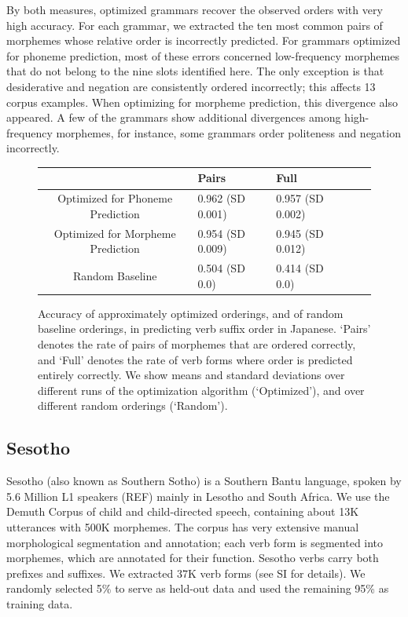 By both measures, optimized grammars recover the observed orders with very high accuracy.
For each grammar, we extracted the ten most common pairs of morphemes whose relative order is incorrectly predicted.
For grammars optimized for phoneme prediction, most of these errors concerned low-frequency morphemes that do not belong to the nine slots identified here.
The only exception is that desiderative and negation are consistently ordered incorrectly; this affects 13 corpus examples.
When optimizing for morpheme prediction, this divergence also appeared.
A few of the grammars show additional divergences among high-frequency morphemes, for instance, some grammars order politeness and negation incorrectly. 





\begin{figure}
\begin{center}
\begin{tabular}{c||llll}
             &       Pairs & Full \\ \hline\hline
Optimized for Phoneme Prediction   &   0.962 (SD 0.001) & 0.957 (SD 0.002) \\
Optimized for Morpheme Prediction  &   0.954 (SD 0.009) & 0.945 (SD 0.012) \\ 
Random Baseline    &  0.504 (SD 0.0) & 0.414 (SD 0.0) \\ 
\end{tabular}
\end{center}
\caption{Accuracy of approximately optimized orderings, and of random baseline orderings, in predicting verb suffix order in Japanese. `Pairs' denotes the rate of pairs of morphemes that are ordered correctly, and `Full' denotes the rate of verb forms where order is predicted entirely correctly. We show means and standard deviations over different runs of the optimization algorithm (`Optimized'), and over different random orderings (`Random').}\label{fig:acc-japanese}
\end{figure}





\subsection{Sesotho}

Sesotho (also known as Southern Sotho) is a Southern Bantu language, spoken by 5.6 Million L1 speakers (REF) mainly in Lesotho and South Africa.
We use the Demuth Corpus \citep{demuth1992acquisition} of child and child-directed speech, containing about 13K utterances with 500K morphemes.
The corpus has very extensive manual morphological segmentation and annotation; each verb form is segmented into morphemes, which are annotated for their function.
Sesotho verbs carry both prefixes and suffixes.
We extracted 37K verb forms (see SI for details).
We randomly selected 5\% to serve as held-out data and used the remaining 95\% as training data.

